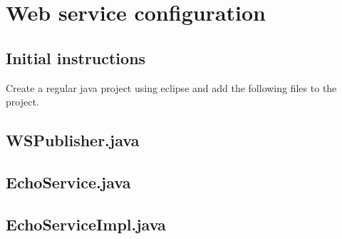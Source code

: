 \section{Web service configuration}
\label{app:webservice}

\subsection{Initial instructions}
Create a regular java project using eclipse and add the following files to the project.

\subsection{WSPublisher.java} 



\subsection{EchoService.java} 



\subsection{EchoServiceImpl.java} 

